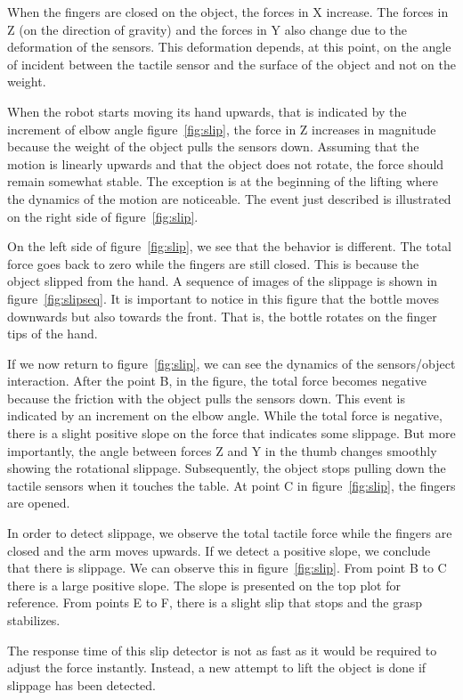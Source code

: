 When the fingers are closed on the object, the forces in X
increase. The forces in Z (on the direction of gravity) and the
forces in Y also change due to the deformation of the sensors.
This deformation depends, at this point, on the angle of incident
between the tactile sensor and the surface of the object and not
on the weight.

When the robot starts moving its hand upwards, that is indicated
by the increment of elbow angle figure~\ref{fig:slip}, the force
in Z increases in magnitude because the weight of the object pulls
the sensors down. Assuming that the motion is linearly upwards and
that the object does not rotate, the force should remain somewhat
stable. The exception is at the beginning of the lifting where the
dynamics of the motion are noticeable. The event just described is
illustrated on the right side of figure~\ref{fig:slip}.

On the left side of figure~\ref{fig:slip}, we see that the
behavior is different. The total force goes back to zero while the
fingers are still closed. This is because the object slipped from
the hand. A sequence of images of the slippage is shown in
figure~\ref{fig:slipseq}. It is important to notice in this figure
that the bottle moves downwards but also towards the front. That
is, the bottle rotates on the finger tips of the hand.

If we now return to figure~\ref{fig:slip}, we can see the dynamics
of the sensors/object interaction. After the point B, in the
figure, the total force becomes negative because the friction with
the object pulls the sensors down. This event is indicated by an
increment on the elbow angle. While the total force is negative,
there is a slight positive slope on the force that indicates some
slippage. But more importantly, the angle between forces Z and Y
in the thumb changes smoothly showing the rotational slippage.
Subsequently, the object stops pulling down the tactile sensors
when it touches the table. At point C in figure~\ref{fig:slip},
the fingers are opened.


In order to detect slippage, we observe the total tactile force
while the fingers are closed and the arm moves upwards. If we
detect a positive slope, we conclude that there is slippage. We
can observe this in figure~\ref{fig:slip}. From point B to C there
is a large positive slope. The slope is presented on the top plot
for reference. From points E to F, there is a slight slip that
stops and the grasp stabilizes.

The response time of this slip detector is not as fast as it would
be required to adjust the force instantly. Instead, a new attempt
to lift the object is done if slippage has been detected.

